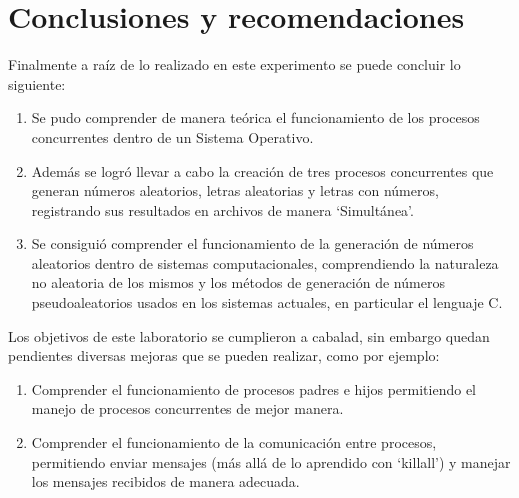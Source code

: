 \section{Conclusiones y recomendaciones}
Finalmente a raíz de lo realizado en este experimento se puede concluir lo siguiente:
\begin{enumerate}
  \item Se pudo comprender de manera teórica el funcionamiento de los procesos concurrentes dentro de un Sistema Operativo.
  \item Además se logró llevar a cabo la creación de tres procesos concurrentes que generan números aleatorios, letras aleatorias y letras con números, registrando sus resultados en archivos de manera `Simultánea'.
  \item Se consiguió comprender el funcionamiento de la generación de números aleatorios dentro de sistemas computacionales, comprendiendo la naturaleza no aleatoria de los mismos y los métodos de generación de números pseudoaleatorios usados en los sistemas actuales, en particular el lenguaje C.
\end{enumerate}

Los objetivos de este laboratorio se cumplieron a cabalad, sin embargo quedan pendientes diversas mejoras que se pueden realizar, como por ejemplo:
\begin{enumerate}
  \item Comprender el funcionamiento de procesos padres e hijos permitiendo el manejo de procesos concurrentes de mejor manera.
  \item Comprender el funcionamiento de la comunicación entre procesos, permitiendo enviar mensajes (más allá de lo aprendido con `killall') y manejar los mensajes recibidos de manera adecuada.
\end{enumerate}